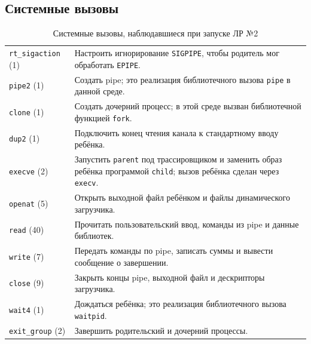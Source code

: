 \documentclass[12pt,a4paper]{article}
\begin{document}
\subsection{Системные вызовы}

\begin{table}[H]
\caption{Системные вызовы, наблюдавшиеся при запуске ЛР №2}
\small
\begin{tabularx}{\linewidth}{|P{3.8cm}|L|}
\hline
{} & \tabularnewline \hline
\texttt{rt\_sigaction} (1) & Настроить игнорирование \texttt{SIGPIPE}, чтобы родитель мог обработать \texttt{EPIPE}. \\ \hline
\texttt{pipe2} (1) & Создать pipe; это реализация библиотечного вызова \texttt{pipe} в данной среде. \\ \hline
\texttt{clone} (1) & Создать дочерний процесс; в этой среде вызван библиотечной функцией \texttt{fork}. \\ \hline
\texttt{dup2} (1) & Подключить конец чтения канала к стандартному вводу ребёнка. \\ \hline
\texttt{execve} (2) & Запустить \texttt{parent} под трассировщиком и заменить образ ребёнка программой \texttt{child}; вызов ребёнка сделан через \texttt{execv}. \\ \hline
\texttt{openat} (5) & Открыть выходной файл ребёнком и файлы динамического загрузчика. \\ \hline
\texttt{read} (40) & Прочитать пользовательский ввод, команды из pipe и данные библиотек. \\ \hline
\texttt{write} (7) & Передать команды по pipe, записать суммы и вывести сообщение о завершении. \\ \hline
\texttt{close} (9) & Закрыть концы pipe, выходной файл и дескрипторы загрузчика. \\ \hline
\texttt{wait4} (1) & Дождаться ребёнка; это реализация библиотечного вызова \texttt{waitpid}. \\ \hline
\texttt{exit\_group} (2) & Завершить родительский и дочерний процессы. \\ \hline
\end{tabularx}
\end{table}
\end{document}
